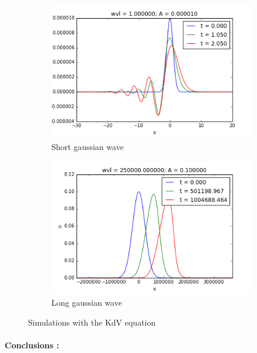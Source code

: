 \begin{figure}[h]
	\begin{subfigure}{.5\linewidth}
		\includegraphics[scale=.45]{figures/criteria6.png}
		\caption{Short gaussian wave 		\label{fig:KdVcriteriaShort}}
	\end{subfigure}
	\begin{subfigure}{.5\linewidth}
		\includegraphics[scale=.45]{figures/criteria5.png}
		\caption{Long gaussian wave		\label{fig:KdVcriteriaLong}}
	\end{subfigure}
	\caption{Simulations with the KdV equation 	\label{fig:KdVcriteria}}
\end{figure}

\paragraph{Conclusions :}

